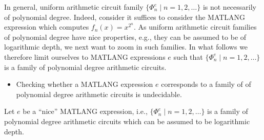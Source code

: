 In general, uniform arithmetic circuit family $\{\Phi_n^e\mid n=1,2,\ldots\}$ is not necessarily of polynomial degree. Indeed, consider it suffices to consider the MATLANG expression which computes
$f_n(x)=x^{2^n}$. 
As uniform arithmetic circuit families of polynomial degree have nice properties, e.g., they can be assumed to be of logarithmic depth, we next want to zoom in such families. In what follows we therefore limit ourselves to MATLANG expressions $e$ such that $\{\Phi_n^e\mid n=1,2,\ldots\}$ is a family of polynomial degree arithmetic circuits.

\begin{itemize}
	\item Checking whether a MATLANG expression $e$ corresponds to a family of of polynomial degree arithmetic circuits is undecidable. 
\end{itemize}

Let $e$ be a ``nice'' MATLANG expression, i.e.,  $\{\Phi_n^e\mid n=1,2,\ldots\}$ is a family of polynomial degree arithmetic circuits which can be assumed to be logarithmic depth. 
